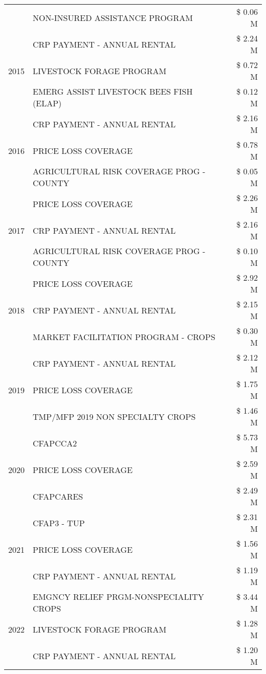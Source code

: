 \begin{tabular}{llr}
 & NON-INSURED ASSISTANCE PROGRAM & \$ 0.06 M \\
\cline{1-3}
\multirow[t]{3}{*}{2015} & CRP PAYMENT - ANNUAL RENTAL & \$ 2.24 M \\
 & LIVESTOCK FORAGE PROGRAM & \$ 0.72 M \\
 & EMERG ASSIST LIVESTOCK BEES FISH (ELAP) & \$ 0.12 M \\
\cline{1-3}
\multirow[t]{3}{*}{2016} & CRP PAYMENT - ANNUAL RENTAL & \$ 2.16 M \\
 & PRICE LOSS COVERAGE & \$ 0.78 M \\
 & AGRICULTURAL RISK COVERAGE PROG - COUNTY & \$ 0.05 M \\
\cline{1-3}
\multirow[t]{3}{*}{2017} & PRICE LOSS COVERAGE & \$ 2.26 M \\
 & CRP PAYMENT - ANNUAL RENTAL & \$ 2.16 M \\
 & AGRICULTURAL RISK COVERAGE PROG - COUNTY & \$ 0.10 M \\
\cline{1-3}
\multirow[t]{3}{*}{2018} & PRICE LOSS COVERAGE & \$ 2.92 M \\
 & CRP PAYMENT - ANNUAL RENTAL & \$ 2.15 M \\
 & MARKET FACILITATION PROGRAM - CROPS & \$ 0.30 M \\
\cline{1-3}
\multirow[t]{3}{*}{2019} & CRP PAYMENT - ANNUAL RENTAL & \$ 2.12 M \\
 & PRICE LOSS COVERAGE & \$ 1.75 M \\
 & TMP/MFP 2019 NON SPECIALTY CROPS & \$ 1.46 M \\
\cline{1-3}
\multirow[t]{3}{*}{2020} & CFAPCCA2 & \$ 5.73 M \\
 & PRICE LOSS COVERAGE & \$ 2.59 M \\
 & CFAPCARES & \$ 2.49 M \\
\cline{1-3}
\multirow[t]{3}{*}{2021} & CFAP3 - TUP & \$ 2.31 M \\
 & PRICE LOSS COVERAGE & \$ 1.56 M \\
 & CRP PAYMENT - ANNUAL RENTAL & \$ 1.19 M \\
\cline{1-3}
\multirow[t]{3}{*}{2022} & EMGNCY RELIEF PRGM-NONSPECIALITY CROPS & \$ 3.44 M \\
 & LIVESTOCK FORAGE PROGRAM & \$ 1.28 M \\
 & CRP PAYMENT - ANNUAL RENTAL & \$ 1.20 M \\
\cline{1-3}
\bottomrule
\end{tabular}
